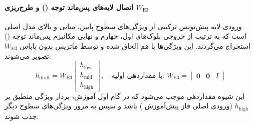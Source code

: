 \paragraph*{اتصال لایه‌های پس‌ماند توجه () و طرح‌ریزی $W_{\text{E3}}$}
ورودی لایه پیش‌نویس ترکیبی از ویژگی‌های سطوح پایین، میانی و بالای مدل اصلی است که به ترتیب از خروجی بلوک‌های اول، چهارم و نهایی مکانیزم پس‌ماند توجه () استخراج می‌گردند. این ویژگی‌ها با هم الحاق شده و توسط ماتریس بدون بایاس $W_{\text{E3}}$ تصویر می‌شوند:
\begin{equation}
    h_{\text{draft}} = W_{\text{E3}} \begin{bmatrix} h_{\text{low}} \\ h_{\text{mid}} \\ h_{\text{high}} \end{bmatrix}, \quad \text{با مقداردهی اولیه: } W_{\text{E3}} = \begin{bmatrix} \mathbf{0} & \mathbf{0} & I \end{bmatrix}
\end{equation}
این شیوه مقداردهی موجب می‌شود که در گام اول آموزش، بردار ویژگی منطبق بر $h_{\text{high}}$ (ورودی اصلی فاز پیش‌آموزش ) باشد و سپس به مرور ویژگی‌های سطوح دیگر جذب شوند.


